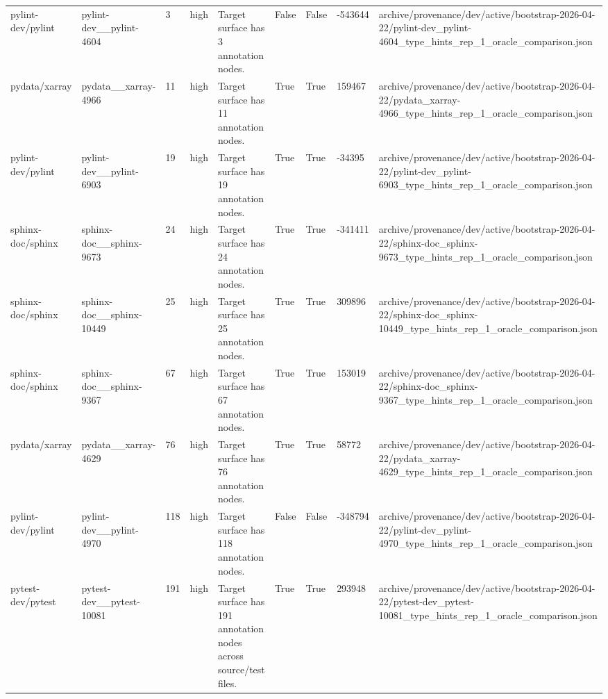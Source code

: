 \begin{tabular}{lllllllll}
pylint-dev/pylint & pylint-dev\_\_pylint-4604 & 3 & high & Target surface has 3 annotation nodes. & False & False & -543644 & archive/provenance/dev/active/bootstrap-2026-04-22/pylint-dev\_pylint-4604\_type\_hints\_rep\_1\_oracle\_comparison.json \\
pydata/xarray & pydata\_\_xarray-4966 & 11 & high & Target surface has 11 annotation nodes. & True & True & 159467 & archive/provenance/dev/active/bootstrap-2026-04-22/pydata\_xarray-4966\_type\_hints\_rep\_1\_oracle\_comparison.json \\
pylint-dev/pylint & pylint-dev\_\_pylint-6903 & 19 & high & Target surface has 19 annotation nodes. & True & True & -34395 & archive/provenance/dev/active/bootstrap-2026-04-22/pylint-dev\_pylint-6903\_type\_hints\_rep\_1\_oracle\_comparison.json \\
sphinx-doc/sphinx & sphinx-doc\_\_sphinx-9673 & 24 & high & Target surface has 24 annotation nodes. & True & True & -341411 & archive/provenance/dev/active/bootstrap-2026-04-22/sphinx-doc\_sphinx-9673\_type\_hints\_rep\_1\_oracle\_comparison.json \\
sphinx-doc/sphinx & sphinx-doc\_\_sphinx-10449 & 25 & high & Target surface has 25 annotation nodes. & True & True & 309896 & archive/provenance/dev/active/bootstrap-2026-04-22/sphinx-doc\_sphinx-10449\_type\_hints\_rep\_1\_oracle\_comparison.json \\
sphinx-doc/sphinx & sphinx-doc\_\_sphinx-9367 & 67 & high & Target surface has 67 annotation nodes. & True & True & 153019 & archive/provenance/dev/active/bootstrap-2026-04-22/sphinx-doc\_sphinx-9367\_type\_hints\_rep\_1\_oracle\_comparison.json \\
pydata/xarray & pydata\_\_xarray-4629 & 76 & high & Target surface has 76 annotation nodes. & True & True & 58772 & archive/provenance/dev/active/bootstrap-2026-04-22/pydata\_xarray-4629\_type\_hints\_rep\_1\_oracle\_comparison.json \\
pylint-dev/pylint & pylint-dev\_\_pylint-4970 & 118 & high & Target surface has 118 annotation nodes. & False & False & -348794 & archive/provenance/dev/active/bootstrap-2026-04-22/pylint-dev\_pylint-4970\_type\_hints\_rep\_1\_oracle\_comparison.json \\
pytest-dev/pytest & pytest-dev\_\_pytest-10081 & 191 & high & Target surface has 191 annotation nodes across source/test files. & True & True & 293948 & archive/provenance/dev/active/bootstrap-2026-04-22/pytest-dev\_pytest-10081\_type\_hints\_rep\_1\_oracle\_comparison.json \\

\end{tabular}
